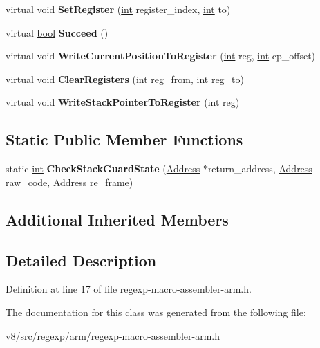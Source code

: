 \begin{DoxyCompactItemize}
virtual void {\bfseries Set\+Register} (\mbox{\hyperlink{classint}{int}} register\+\_\+index, \mbox{\hyperlink{classint}{int}} to)
\item 
\mbox{\label{classv8_1_1internal_1_1RegExpMacroAssemblerARM_a89126f9df2c96598201f8cb75f395b32}} 
virtual \mbox{\hyperlink{classbool}{bool}} {\bfseries Succeed} ()
\item 
\mbox{\label{classv8_1_1internal_1_1RegExpMacroAssemblerARM_a5b15ff05d71a5d1f697b9479570a23b7}} 
virtual void {\bfseries Write\+Current\+Position\+To\+Register} (\mbox{\hyperlink{classint}{int}} reg, \mbox{\hyperlink{classint}{int}} cp\+\_\+offset)
\item 
\mbox{\label{classv8_1_1internal_1_1RegExpMacroAssemblerARM_aa68065432d4ec27b211c32b65176287c}} 
virtual void {\bfseries Clear\+Registers} (\mbox{\hyperlink{classint}{int}} reg\+\_\+from, \mbox{\hyperlink{classint}{int}} reg\+\_\+to)
\item 
\mbox{\label{classv8_1_1internal_1_1RegExpMacroAssemblerARM_a814a3f46fa94c5ee2047de33ed527000}} 
virtual void {\bfseries Write\+Stack\+Pointer\+To\+Register} (\mbox{\hyperlink{classint}{int}} reg)
\end{DoxyCompactItemize}
\subsection*{Static Public Member Functions}
\begin{DoxyCompactItemize}
\item 
\mbox{\label{classv8_1_1internal_1_1RegExpMacroAssemblerARM_af0e345e700044bdd3e87d1f4032d4916}} 
static \mbox{\hyperlink{classint}{int}} {\bfseries Check\+Stack\+Guard\+State} (\mbox{\hyperlink{classuintptr__t}{Address}} $\ast$return\+\_\+address, \mbox{\hyperlink{classuintptr__t}{Address}} raw\+\_\+code, \mbox{\hyperlink{classuintptr__t}{Address}} re\+\_\+frame)
\end{DoxyCompactItemize}
\subsection*{Additional Inherited Members}


\subsection{Detailed Description}


Definition at line 17 of file regexp-\/macro-\/assembler-\/arm.\+h.



The documentation for this class was generated from the following file\+:\begin{DoxyCompactItemize}
\item 
v8/src/regexp/arm/regexp-\/macro-\/assembler-\/arm.\+h\end{DoxyCompactItemize}
